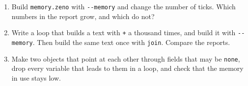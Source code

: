\begin{tryit}
\begin{enumerate}
\item Build \verb|memory.zeno| with \verb|--memory| and change the
  number of ticks. Which numbers in the report grow, and which do not?
\item Write a loop that builds a text with \verb|+| a thousand times,
  and build it with \verb|--memory|. Then build the same text once with
  \verb|join|. Compare the reports.
\item Make two objects that point at each other through fields that may
  be \verb|none|, drop every variable that leads to them in a loop, and
  check that the memory in use stays low.
\end{enumerate}
\end{tryit}
